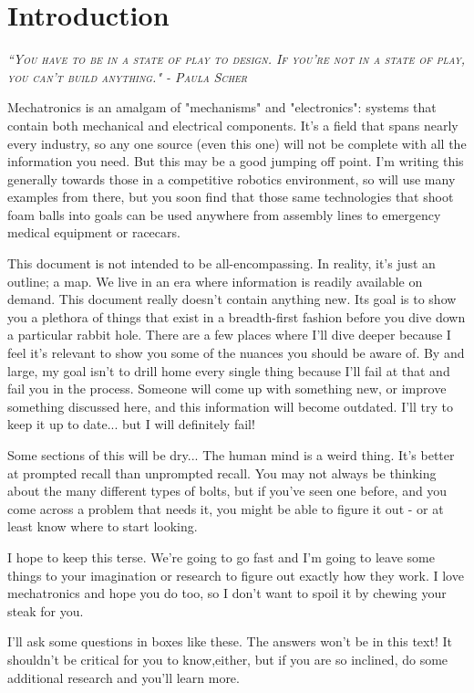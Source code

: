 
\chapter{Introduction}
 
 {\slshape \scshape ``You have to be in a state of play to design. If you're not in a state of play, you can't build anything." - Paula Scher}

Mechatronics is an amalgam of "mechanisms" and "electronics": systems that contain both mechanical and electrical components. It's a field that spans nearly every industry, so any one source (even this one) will not be complete with all the information you need. But this may be a good jumping off point. I'm writing this generally towards those in a competitive robotics environment, so will use many examples from there, but you soon find that those same technologies that shoot foam balls into goals can be used anywhere from assembly lines to emergency medical equipment or racecars.

This document is not intended to be all-encompassing. In reality, it's just an outline; a map. We live in an era where information is readily available on demand. This document really doesn't contain anything new. Its goal is to show you a plethora of things that exist in a breadth-first fashion before you dive down a particular rabbit hole. There are a few places where I'll dive deeper because I feel it's relevant to show you some of the nuances you should be aware of. By and large, my goal isn't to drill home every single thing because I'll fail at that and fail you in the process. Someone will come up with something new, or improve something discussed here, and this information will become outdated. I'll try to keep it up to date... but I will definitely fail!

Some sections of this will be dry... The human mind is a weird thing. It's better at prompted recall than unprompted recall. You may not always be thinking about the many different types of bolts, but if you've seen one before, and you come across a problem that needs it, you might be able to figure it out - or at least know where to start looking.

I hope to keep this terse. We're going to go fast and I'm going to leave some things to your imagination or research to figure out exactly how they work. I love mechatronics and hope you do too, so I don't want to spoil it by chewing your steak for you.

\begin{qbox}
	I'll ask some questions in boxes like these. The answers won't be in this text! It shouldn't be critical for you to know,either, but if you are so inclined, do some additional research and you'll learn more.
\end{qbox}

